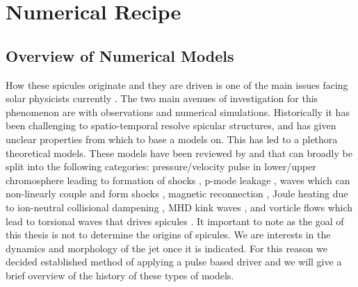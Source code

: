 \chapter{Numerical Recipe}
\label{chap:Numerical_Recipe}
\section{Overview of Numerical Models}
\label{sec:models}
How these spicules originate and they are driven is one of the main issues facing solar physicists currently \citep{Tsiropoula2012,kuzma2017ApJ84978K,Martinez-Sykora2017}. The two main avenues of investigation for this phenomenon are with observations and numerical simulations. Historically it has been challenging to spatio-temporal resolve spicular structures, and has given unclear properties from which to base a models on. This has led to a plethora theoretical models. These models have been reviewed by \cite{Sterling_2000SoPh} and \cite{Aschwanden2019ASSL} that can broadly be split into the following categories: pressure/velocity pulse in lower/upper chromosphere leading to formation of shocks \citep{Shibata1982,Suematsu1982SoPh7599S,Hollweg1982ApJ257345H,Sterling1990ApJ349647S,Heggland2007ApJ6661277H,kuzma2017ApJ84978K}, p-mode leakage \citep{Pontieu2004Natur},  \Alfven waves which can non-linearly couple and form shocks \citep{Hollweg1982SoPh7535H,Hollweg1992ApJ389731H, Kudoh1999ApJ514493K, Matsumoto2010ApJ7101857M}, magnetic reconnection \citep{Yokoyama1995Natur37542Y,Yokoyama1996PASJ48353Y, Archontis2005ApJ6351299A, Pontieu2007PASJ,Isobe2008ApJ679L57I,Nishizuka2008ApJ683L83N,Sterling2010ApJ,Gonz2017ApJ,Gonz2018arXiv180704224G,Gonz2018ApJ856176G}, Joule heating due to ion-neutral collisional dampening \citep{Haerendel1992Natur360241H,James2003AA}, MHD kink waves \citep{Kukhianidze2006A&A}, and vorticle flows which lead to torsional \Alfven waves that drives spicules \citep{Iijima2017ApJ,Samanta2019Sci}. \np
%
It important to note as the goal of this thesis is not to determine the origins of spicules. We are interests in the dynamics and morphology of the jet once it is indicated. For this reason we decided established method of applying a pulse based driver and we will give a brief overview of the history of these types of models.   
